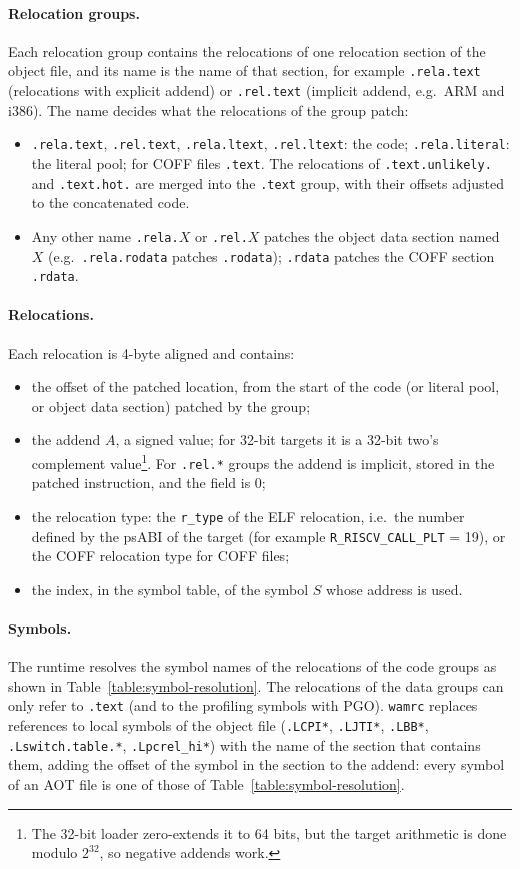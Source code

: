 \documentclass{article}
\begin{document}
\paragraph{Relocation groups.}
Each relocation group contains the relocations of one relocation section of the object file, and its name is the name of that section, for example \verb|.rela.text| (relocations with explicit addend) or \verb|.rel.text| (implicit addend, e.g.\ ARM and i386).
The name decides what the relocations of the group patch:
\begin{itemize}
    \item \verb|.rela.text|, \verb|.rel.text|, \verb|.rela.ltext|, \verb|.rel.ltext|: the code; \verb|.rela.literal|: the literal pool; for COFF files \verb|.text|. The relocations of \verb|.text.unlikely.| and \verb|.text.hot.| are merged into the \verb|.text| group, with their offsets adjusted to the concatenated code.
    \item Any other name \verb|.rela.|$X$ or \verb|.rel.|$X$ patches the object data section named $X$ (e.g.\ \verb|.rela.rodata| patches \verb|.rodata|); \verb|.rdata| patches the COFF section \verb|.rdata|.
\end{itemize}

\paragraph{Relocations.}
Each relocation is 4-byte aligned and contains:
\begin{itemize}
    \item the offset of the patched location, from the start of the code (or literal pool, or object data section) patched by the group;
    \item the addend $A$, a signed value; for 32-bit targets it is a 32-bit two's complement value\footnote{The 32-bit loader zero-extends it to 64 bits, but the target arithmetic is done modulo $2^{32}$, so negative addends work.}. For \verb|.rel.*| groups the addend is implicit, stored in the patched instruction, and the field is 0;
    \item the relocation type: the \verb|r_type| of the ELF relocation, i.e.\ the number defined by the psABI of the target (for example \verb|R_RISCV_CALL_PLT| = 19), or the COFF relocation type for COFF files;
    \item the index, in the symbol table, of the symbol $S$ whose address is used.
\end{itemize}

\paragraph{Symbols.}
The runtime resolves the symbol names of the relocations of the code groups as shown in Table~\ref{table:symbol-resolution}.
The relocations of the data groups can only refer to \verb|.text| (and to the profiling symbols with PGO).
\texttt{wamrc} replaces references to local symbols of the object file (\verb|.LCPI*|, \verb|.LJTI*|, \verb|.LBB*|, \verb|.Lswitch.table.*|, \verb|.Lpcrel_hi*|) with the name of the section that contains them, adding the offset of the symbol in the section to the addend: every symbol of an AOT file is one of those of Table~\ref{table:symbol-resolution}.
\end{document}
